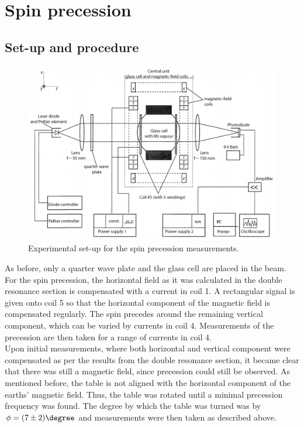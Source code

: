 \section{Spin precession}
\subsection{Set-up and procedure}
\begin{figure}
\centering
\includegraphics[width=1.0\linewidth]{graphics/spinprecessionsetup}
\caption[Spin precession set-up]{Experimental set-up for the spin precession measurements. \cite{anleitung}}
\label{fig:spinprecessionsetup}
\end{figure}
As before, only a quarter wave plate and the glass cell are placed in the beam. For the spin precession, the horizontal field as it was calculated in the double resonance section is compensated with a current in coil 1. A rectangular signal is given onto coil 5 so that the horizontal component of the magnetic field is compensated regularly. The spin precedes around the remaining vertical component, which can be varied by currents in coil 4. Measurements of the precession are then taken for a range of currents in coil 4.\\

Upon initial measurements, where both horizontal and vertical component were compensated as per the results from the double resonance section, it became clear that there was still a magnetic field, since precession could still be observed. As mentioned before, the table is not aligned with the horizontal component of the earths' magnetic field. Thus, the table was rotated until a minimal precession frequency was found. The degree by which the table was turned was by $\phi=\unit{(7\pm2)}{\degree}$ and measurements were then taken as described above.

